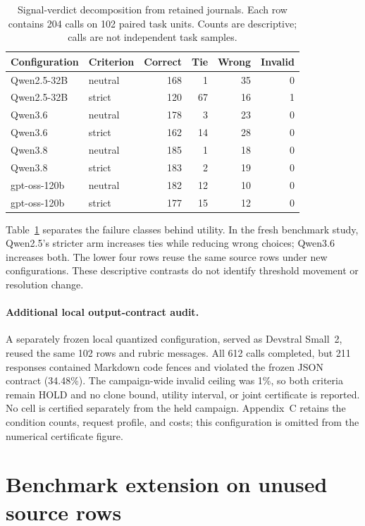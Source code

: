 \documentclass[10pt]{article}
\begin{document}
\begin{table}[t]
\centering\scriptsize
\caption{Signal-verdict decomposition from retained journals. Each row contains 204 calls on 102 paired task units. Counts are descriptive; calls are not independent task samples.}
\label{tab:signal-decomposition}
\begin{tabular}{llrrrr}
\toprule
Configuration & Criterion & Correct & Tie & Wrong & Invalid\\
\midrule
Qwen2.5-32B & neutral & 168 & 1 & 35 & 0\\
Qwen2.5-32B & strict & 120 & 67 & 16 & 1\\
Qwen3.6 & neutral & 178 & 3 & 23 & 0\\
Qwen3.6 & strict & 162 & 14 & 28 & 0\\
\midrule
Qwen3.8 & neutral & 185 & 1 & 18 & 0\\
Qwen3.8 & strict & 183 & 2 & 19 & 0\\
gpt-oss-120b & neutral & 182 & 12 & 10 & 0\\
gpt-oss-120b & strict & 177 & 15 & 12 & 0\\
\bottomrule
\end{tabular}
\end{table}
Table~\ref{tab:signal-decomposition} separates the failure classes behind utility. In the fresh benchmark study, Qwen2.5's stricter arm increases ties while reducing wrong choices; Qwen3.6 increases both. The lower four rows reuse the same source rows under new configurations. These descriptive contrasts do not identify threshold movement or resolution change.

\paragraph{Additional local output-contract audit.}
A separately frozen local quantized configuration, served as Devstral Small~2, reused the same 102 rows and rubric messages. All 612 calls completed, but 211 responses contained Markdown code fences and violated the frozen JSON contract (34.48\%). The campaign-wide invalid ceiling was 1\%, so both criteria remain HOLD and no clone bound, utility interval, or joint certificate is reported. No cell is certified separately from the held campaign. Appendix~C retains the condition counts, request profile, and costs; this configuration is omitted from the numerical certificate figure.


\section{Benchmark extension on unused source rows}
\label{sec:held485}
\end{document}
